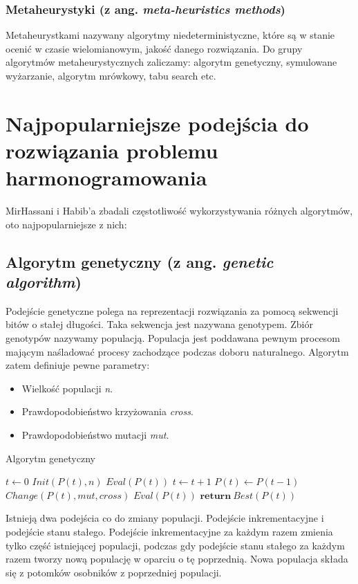 \subsubsection{Metaheurystyki (z ang. \emph{meta-heuristics methods})}
Metaheurystkami nazywany algorytmy niedeterministyczne, które są w stanie ocenić
w czasie wielomianowym, jakość danego rozwiązania. Do grupy algorytmów
metaheurystycznych zaliczamy: algorytm genetyczny, symulowane wyżarzanie,
algorytm mrówkowy, tabu search etc.
\section{Najpopularniejsze podejścia do rozwiązania problemu harmonogramowania}
MirHassani i Habib'a zbadali częstotliwość wykorzystywania różnych
algorytmów, oto najpopularniejsze z nich:
\subsection{Algorytm genetyczny (z ang. \emph{genetic algorithm})}
Podejście genetyczne \cite{komosinski2021} polega na reprezentacji rozwiązania za pomocą sekwencji
bitów o stałej długości. Taka sekwencja jest nazywana genotypem. Zbiór genotypów nazywamy
populacją. Populacja jest poddawana pewnym procesom mającym naśladować procesy
zachodzące podczas doboru naturalnego. Algorytm zatem definiuje pewne parametry:
\begin{itemize}
	\item Wielkość populacji \emph{n}.
	\item Prawdopodobieństwo krzyżowania \emph{cross}.
	\item Prawdopodobieństwo mutacji \emph{mut}.
\end{itemize}
\begin{algorithm}
\caption{Algorytm genetyczny}\label{alg-genetic}
\begin{algorithmic}[1]
\State $t\gets 0$
\State $Init(P(t),n)$
\State $Eval(P(t))$
\State $t\gets t+1$
\State $P(t)\gets P(t-1)$
\State $Change(P(t),mut,cross)$
\State $Eval(P(t))$
\EndWhile\label{euclidendwhile}
\State $\textbf{return}\ Best(P(t))$
\EndProcedure
\end{algorithmic}
\end{algorithm}
Istnieją dwa podejścia co do zmiany populacji. Podejście inkrementacyjne i
podejście stanu stałego. Podejście inkrementacyjne za każdym razem zmienia tylko
część istniejącej populacji, podczas gdy podejście stanu stałego za każdym razem
tworzy nową populację w oparciu o tę poprzednią. Nowa populacja składa się z
potomków osobników z poprzedniej populacji.

